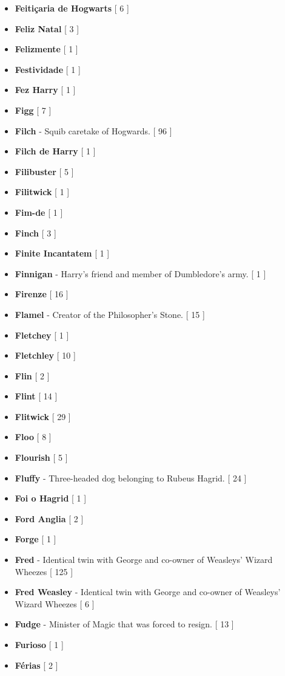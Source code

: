 \documentclass[a4paper]{article}
\begin{document}
{\begin{itemize}
	\item \textbf{Feitiçaria de Hogwarts} [ 6 ]
	\item \textbf{Feliz Natal} [ 3 ]
	\item \textbf{Felizmente} [ 1 ]
	\item \textbf{Festividade} [ 1 ]
	\item \textbf{Fez Harry} [ 1 ]
	\item \textbf{Figg} [ 7 ]
	\item \textbf{Filch} - Squib caretake of Hogwards. [ 96 ]
	\item \textbf{Filch de Harry} [ 1 ]
	\item \textbf{Filibuster} [ 5 ]
	\item \textbf{Filitwick} [ 1 ]
	\item \textbf{Fim-de} [ 1 ]
	\item \textbf{Finch} [ 3 ]
	\item \textbf{Finite Incantatem} [ 1 ]
	\item \textbf{Finnigan} - Harry's friend and member of Dumbledore's army. [ 1 ]
	\item \textbf{Firenze} [ 16 ]
	\item \textbf{Flamel} - Creator of the Philosopher's Stone. [ 15 ]
	\item \textbf{Fletchey} [ 1 ]
	\item \textbf{Fletchley} [ 10 ]
	\item \textbf{Flin} [ 2 ]
	\item \textbf{Flint} [ 14 ]
	\item \textbf{Flitwick} [ 29 ]
	\item \textbf{Floo} [ 8 ]
	\item \textbf{Flourish} [ 5 ]
	\item \textbf{Fluffy} - Three-headed dog belonging to Rubeus Hagrid. [ 24 ]
	\item \textbf{Foi o Hagrid} [ 1 ]
	\item \textbf{Ford Anglia} [ 2 ]
	\item \textbf{Forge} [ 1 ]
	\item \textbf{Fred} - Identical twin with George and co-owner of Weasleys' Wizard Wheezes [ 125 ]
	\item \textbf{Fred Weasley} - Identical twin with George and co-owner of Weasleys' Wizard Wheezes [ 6 ]
	\item \textbf{Fudge} - Minister of Magic that was forced to resign. [ 13 ]
	\item \textbf{Furioso} [ 1 ]
	\item \textbf{Férias} [ 2 ]

\end{itemize}}
\end{document}
